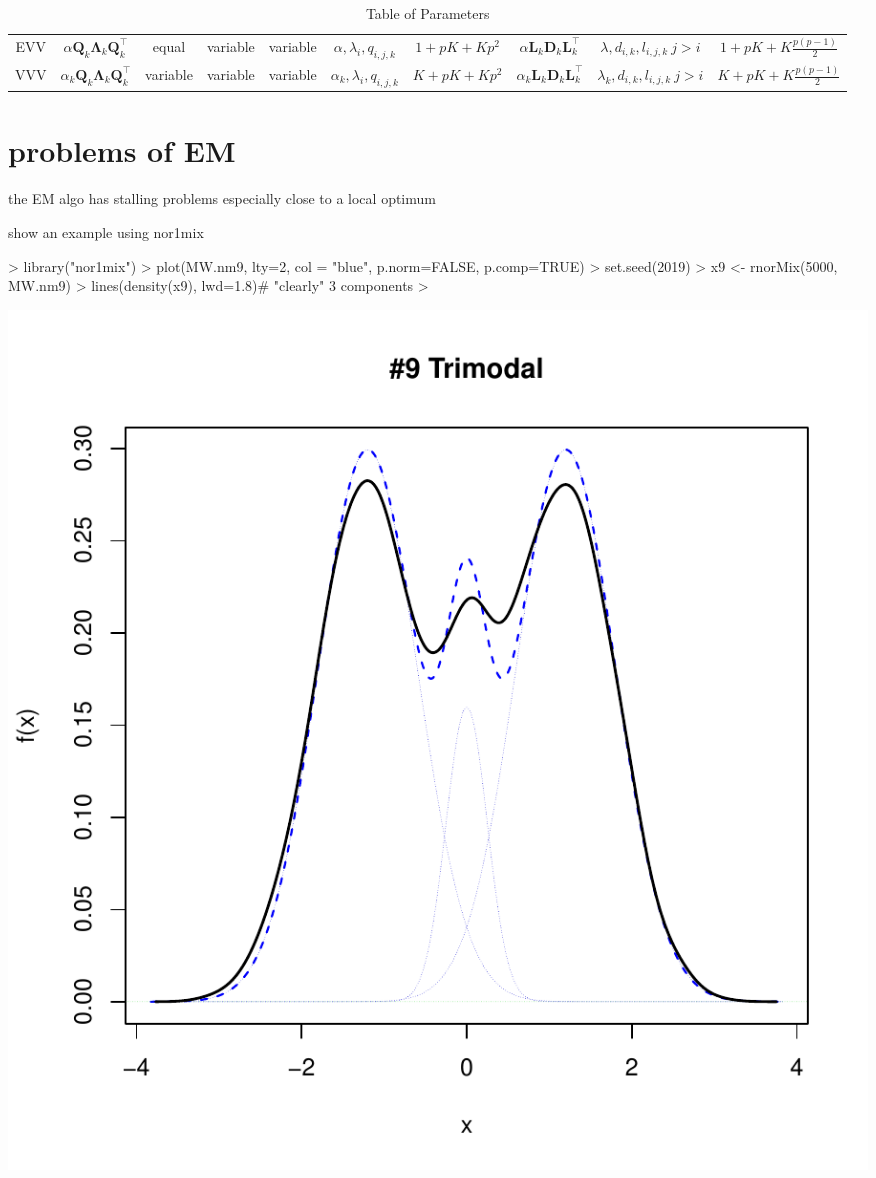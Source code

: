 \begin{table}[!htb]
{\begin{tabular}{| c | c c c c c c | c c c |}
        \hline
        EVV    & $ \alpha \pmb{Q}_k \pmb{\Lambda}_k \pmb{Q}_k^\top $ & equal & variable & variable & $ \alpha, \lambda_{i}, q_{i,j,k} $ & $ 1+pK+Kp^2 $ & $ \alpha \pmb{L}_k \pmb{D}_k \pmb{L}_k^\top $ & $ \lambda, d_{i,k}, l_{i,j,k}\ j>i $ & $ 1+pK+K\frac{p(p-1)}{2} $ \\
        VVV    & $ \alpha_k \pmb{Q}_k \pmb{\Lambda}_k \pmb{Q}_k^\top $ & variable & variable & variable & $ \alpha_k, \lambda_{i}, q_{i,j,k} $ & $ K+pK+Kp^2 $ & $ \alpha_k \pmb{L}_k \pmb{D}_k \pmb{L}_k^\top $ & $ \lambda_k, d_{i,k}, l_{i,j,k}\ j>i $ & $ K+pK+K\frac{p(p-1)}{2} $ \\
        \hline
    \end{tabular}

    \label{table:1}

}

\caption{Table of Parameters}

\end{table}


\clearpage

\section{problems of EM}


the EM algo has stalling problems especially close to a local optimum

show an example using nor1mix


\begin{Schunk}
\begin{Sinput}
> library("nor1mix")
> plot(MW.nm9, lty=2, col = "blue", p.norm=FALSE, p.comp=TRUE)
> set.seed(2019)
> x9 <- rnorMix(5000, MW.nm9)
> lines(density(x9), lwd=1.8)# "clearly" 3 components
> 
\end{Sinput}
\end{Schunk}
\includegraphics{chapter1-001}


